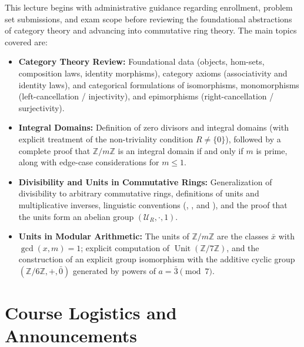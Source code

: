 \begin{overview}
This lecture begins with administrative guidance regarding enrollment, problem set submissions, and exam scope before reviewing the foundational abstractions of category theory and advancing into commutative ring theory. The main topics covered are:
\begin{itemize}
    \item \textbf{Category Theory Review:} Foundational data (objects, hom-sets, composition laws, identity morphisms), category axioms (associativity and identity laws), and categorical formulations of isomorphisms, monomorphisms (left-cancellation / injectivity), and epimorphisms (right-cancellation / surjectivity).
    \item \textbf{Integral Domains:} Definition of zero divisors and integral domains (with explicit treatment of the non-triviality condition $R \neq \{0\}$), followed by a complete proof that $\mathbb{Z}/m\mathbb{Z}$ is an integral domain if and only if $m$ is prime, along with edge-case considerations for $m \le 1$.
    \item \textbf{Divisibility and Units in Commutative Rings:} Generalization of divisibility to arbitrary commutative rings, definitions of units and multiplicative inverses, linguistic conventions (, , and ), and the proof that the units form an abelian group $(\mathcal{U}_R, \cdot, 1)$.
    \item \textbf{Units in Modular Arithmetic:} The units of $\mathbb{Z}/m\mathbb{Z}$ are the classes $\bar{x}$ with $\operatorname{gcd}(x, m) = 1$; explicit computation of $\operatorname{Unit}(\mathbb{Z}/7\mathbb{Z})$, and the construction of an explicit group isomorphism with the additive cyclic group $(\mathbb{Z}/6\mathbb{Z}, +, \bar{0})$ generated by powers of $a = \bar{3} \pmod 7$.
\end{itemize}
\end{overview}

\section{Course Logistics and Announcements}

